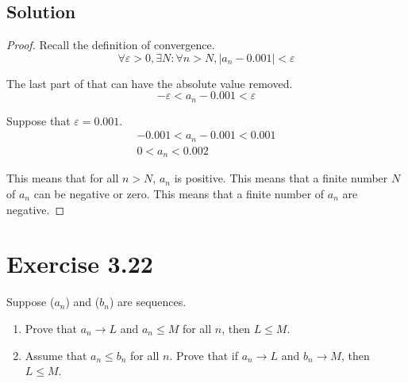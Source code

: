 \documentclass[12pt]{report}
\begin{document}
    \subsection{Solution}
        \begin{proof}
            Recall the definition of convergence.
            \begin{equation}
                \forall \varepsilon > 0, \exists N : \forall n > N, \left| a_n - 0.001 \right| < \varepsilon
            \end{equation}

            The last part of that can have the absolute value removed.
            \begin{equation}
                -\varepsilon < a_n - 0.001 < \varepsilon
            \end{equation}

            Suppose that $\varepsilon = 0.001$.
            \begin{gather}
                -0.001 < a_n - 0.001 < 0.001\\
                0 < a_n < 0.002
            \end{gather}

            This means that for all $n > N$, $a_n$ is positive.
            This means that a finite number $N$ of $a_n$ can be negative or zero.
            This means that a finite number of $a_n$ are negative.
        \end{proof}    
    \pagebreak
    
\section{Exercise 3.22}
    Suppose ($a_n$) and ($b_n$) are sequences.
    \begin{enumerate}[label=(\alph*)]
        \item   Prove that $a_n \to L$ and $a_n \leq M$ for all $n$, then $L \leq M$.
        \item   Assume that $a_n \leq b_n$ for all $n$. Prove that if $a_n \to L$ and $b_n \to M$, then $L \leq M$.
    \end{enumerate}
\end{document}
